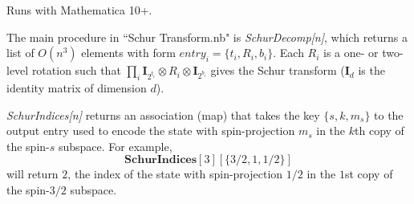 \documentclass[12pt]{article}
\begin{document}
Runs with Mathematica 10+.

The main procedure in ``Schur Transform.nb" is \emph{SchurDecomp[n]}, which returns a list of $O(n^3)$ elements with form $entry_i=\{t_i,R_i,b_i\}$.
Each $R_i$ is a one- or two-level rotation such that $\prod_i\textbf{I}_{2^{t_i}}\otimes R_i\otimes\textbf{I}_{2^{b_i}}$ gives the Schur transform ($\textbf{I}_d$ is the identity matrix of dimension $d$).

\emph{SchurIndices[n]} returns an association (map) that takes the key $\{s,k,m_s\}$ to the output entry used to encode the state with spin-projection $m_s$ in the $k$th copy of the spin-$s$ subspace.
For example, $$\textbf{SchurIndices}[3][\{3/2,1,1/2\}]$$ will return $2$, the index of the state with spin-projection $1/2$ in the $1$st copy of the spin-$3/2$ subspace.
\end{document}
